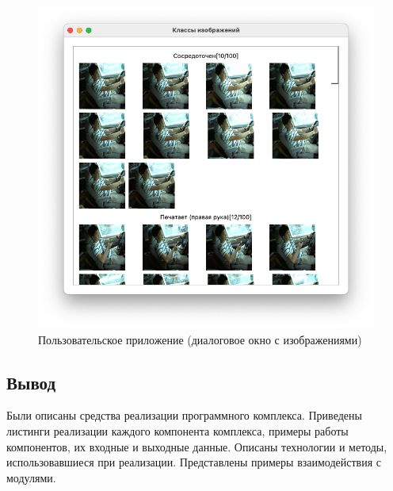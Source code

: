 \begin{figure}[hbtp]
	\centering
	\includegraphics[scale=0.55]{img/example_app_3.png}
	\caption{Пользовательское приложение (диалоговое окно с изображениями)}
	\label{fig:example_app_3}
\end{figure}
\clearpage

\subsection*{Вывод}
Были описаны средства реализации программного комплекса. Приведены листинги реализации каждого компонента комплекса, примеры работы компонентов, их входные и выходные данные. Описаны технологии и методы, использовавшиеся при реализации. Представлены примеры взаимодействия с модулями.

\pagebreak